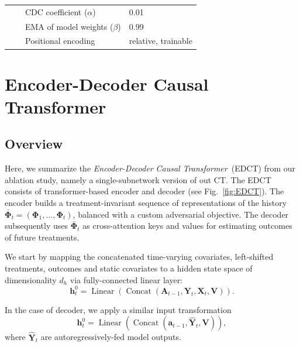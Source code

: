 \documentclass{article}
\theoremstyle{plain}
\theoremstyle{definition}
\theoremstyle{remark}
\newcommand{\longname}{\emph{Causal Transformer}\xspace}
\newcommand{\shortname}{CT\xspace}
\begin{document}
\begin{table}[t]
\begin{center}
\begin{small}
\begin{tabular}{l|l|l|l}
                        && CDC coefficient ($\alpha$) & 0.01 \\
                        && EMA of model weights ($\beta$) & 0.99 \\
                        && Positional encoding & relative, trainable \\
                    \bottomrule
                \end{tabular}
        \end{small}
    \end{center}
    \vskip -0.1in
\end{table}

\clearpage
\section{Encoder-Decoder Causal Transformer} \label{app:EDCT}
\subsection{Overview}

Here, we summarize the \emph{Encoder-Decoder} \longname~(EDCT) from our ablation study, namely a single-subnetwork version of out \shortname. The EDCT consists of transformer-based encoder and decoder (see Fig.~\ref{fig:EDCT}). The encoder builds a treatment-invariant sequence of representations of the history $\bar{\mathbf{\Phi}}_t = (\mathbf{\Phi}_1, \dots, \mathbf{\Phi}_t )$, balanced with a custom adversarial objective. The decoder subsequently uses $\bar{\mathbf{\Phi}}_t$ as cross-attention keys and values for estimating outcomes of future treatments.

We start by mapping the concatenated time-varying covariates, left-shifted treatments, outcomes and static covariates to a hidden state space of dimensionality $d_h$ via fully-connected linear layer:
\begin{equation}
    \mathbf{h}_t^0 = \operatorname{Linear}( \operatorname{Concat}(\mathbf{A}_{t-1}, \mathbf{Y}_{t},  \mathbf{X}_{t},  \mathbf{V})).
\end{equation}

In the case of decoder, we apply a similar input transformation
\begin{equation}
    \mathbf{h}_t^0 = \operatorname{Linear}( \operatorname{Concat}(\mathbf{a}_{t-1}, \hat{\mathbf{Y}}_{t}, \mathbf{V})),
\end{equation}
where $\hat{\mathbf{Y}}_{t}$ are autoregressively-fed model outputs. 
\end{document}
